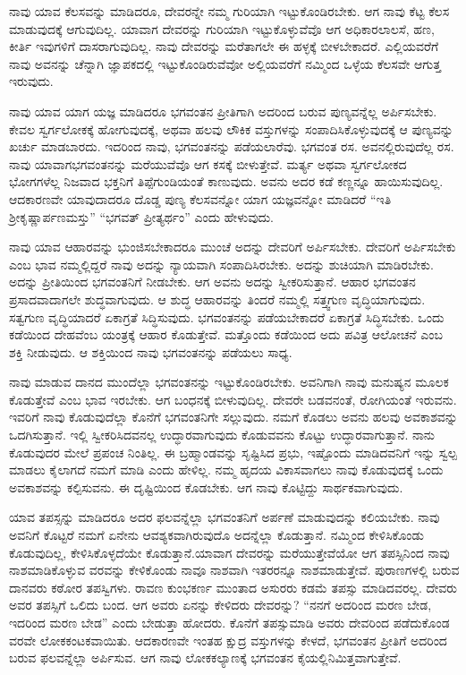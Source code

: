 ನಾವು ಯಾವ ಕೆಲಸವನ್ನು ಮಾಡಿದರೂ, ದೇವರನ್ನೇ ನಮ್ಮ ಗುರಿಯಾಗಿ ಇಟ್ಟುಕೊಂಡಿರಬೇಕು. ಆಗ ನಾವು ಕೆಟ್ಟ ಕೆಲಸ ಮಾಡುವುದಕ್ಕೆ ಆಗುವುದಿಲ್ಲ. ಯಾವಾಗ ದೇವರನ್ನು ಗುರಿಯಾಗಿ ಇಟ್ಟುಕೊಳ್ಳುವೆವೊ ಆಗ ಅಧಿಕಾರಲಾಲಸೆ, ಹಣ, ಕೀರ್ತಿ ಇವುಗಳಿಗೆ ದಾಸರಾಗುವುದಿಲ್ಲ. ನಾವು ದೇವರನ್ನು ಮರೆತಾಗಲೇ ಈ ಹಳ್ಳಕ್ಕೆ ಬೀಳಬೇಕಾದರೆ. ಎಲ್ಲಿಯವರೆಗೆ ನಾವು ಅವನನ್ನು ಚೆನ್ನಾಗಿ ಜ್ಞಾಪಕದಲ್ಲಿ ಇಟ್ಟುಕೊಂಡಿರುವೆವೋ ಅಲ್ಲಿಯವರೆಗೆ ನಮ್ಮಿಂದ ಒಳ್ಳೆಯ ಕೆಲಸವೇ ಆಗುತ್ತ ಇರುವುದು.

ನಾವು ಯಾವ ಯಾಗ ಯಜ್ಞ ಮಾಡಿದರೂ ಭಗವಂತನ ಪ್ರೀತಿಗಾಗಿ ಅದರಿಂದ ಬರುವ ಪುಣ್ಯವನ್ನೆಲ್ಲ ಅರ್ಪಿಸಬೇಕು. ಕೇವಲ ಸ್ವರ್ಗಲೋಕಕ್ಕೆ ಹೋಗುವುದಕ್ಕೆ, ಅಥವಾ ಹಲವು ಲೌಕಿಕ ವಸ್ತುಗಳನ್ನು ಸಂಪಾದಿಸಿಕೊಳ್ಳುವುದಕ್ಕೆ ಆ ಪುಣ್ಯವನ್ನು ಖರ್ಚು ಮಾಡಬಾರದು. ಇದರಿಂದ ನಾವು, ಭಗವಂತನನ್ನು ಪಡೆಯಲಾರೆವು. ಭಗವಂತ ರಸ. ಅವನಲ್ಲಿರುವುದೆಲ್ಲ ರಸ. ನಾವು ಯಾವಾಗ\break ಭಗವಂತನನ್ನು ಮರೆಯುವೆವೊ ಆಗ ಕಸಕ್ಕೆ ಬೀಳುತ್ತೇವೆ. ಮರ್ತ್ಯ ಅಥವಾ ಸ್ವರ್ಗಲೋಕದ ಭೋಗಗಳೆಲ್ಲ ನಿಜವಾದ ಭಕ್ತನಿಗೆ ತಿಪ್ಪೆಗುಂಡಿಯಂತೆ ಕಾಣುವುದು. ಅವನು ಅದರ ಕಡೆ ಕಣ್ಣನ್ನೂ ಹಾಯಿಸುವುದಿಲ್ಲ. ಆದಕಾರಣವೇ ಯಾವುದಾದರೂ ದೊಡ್ಡ ಪುಣ್ಯ ಕೆಲಸವನ್ನೋ ಯಾಗ ಯಜ್ಞವನ್ನೋ ಮಾಡಿದರೆ “ಇತಿ ಶ‍್ರೀಕೃಷ್ಣಾರ್ಪಣಮಸ್ತು” “ಭಗವತ್ ಪ್ರೀತ್ಯರ್ಥಂ” ಎಂದು ಹೇಳುವುದು.

ನಾವು ಯಾವ ಆಹಾರವನ್ನು ಭುಂಜಿಸಬೇಕಾದರೂ ಮುಂಚೆ ಅದನ್ನು ದೇವರಿಗೆ ಅರ್ಪಿಸಬೇಕು. ದೇವರಿಗೆ ಅರ್ಪಿಸಬೇಕು ಎಂಬ ಭಾವ ನಮ್ಮಲ್ಲಿದ್ದರೆ ನಾವು ಅದನ್ನು ನ್ಯಾಯವಾಗಿ ಸಂಪಾದಿಸಿರಬೇಕು. ಅದನ್ನು ಶುಚಿಯಾಗಿ ಮಾಡಿರಬೇಕು. ಅದನ್ನು ಪ್ರೀತಿಯಿಂದ ಭಗವಂತನಿಗೆ ನೀಡಬೇಕು. ಆಗ ಅವನು ಅದನ್ನು ಸ್ವೀಕರಿಸುತ್ತಾನೆ. ಆಹಾರ ಭಗವಂತನ ಪ್ರಸಾದವಾದಾಗಲೇ ಶುದ್ಧವಾಗುವುದು. ಆ ಶುದ್ಧ ಆಹಾರವನ್ನು ತಿಂದರೆ ನಮ್ಮಲ್ಲಿ ಸತ್ತ್ವಗುಣ ವೃದ್ಧಿಯಾಗುವುದು. ಸತ್ವಗುಣ ವೃದ್ಧಿಯಾದರೆ ಏಕಾಗ್ರತೆ ಸಿದ್ಧಿಸುವುದು. ಭಗವಂತನನ್ನು ಪಡೆಯಬೇಕಾದರೆ ಏಕಾಗ್ರತೆ ಸಿದ್ಧಿಸಬೇಕು. ಒಂದು ಕಡೆಯಿಂದ ದೇಹವೆಂಬ ಯಂತ್ರಕ್ಕೆ ಆಹಾರ ಕೊಡುತ್ತೇವೆ. ಮತ್ತೊಂದು ಕಡೆಯಿಂದ ಅದು ಪವಿತ್ರ ಆಲೋಚನೆ ಎಂಬ ಶಕ್ತಿ ನೀಡುವುದು. ಆ ಶಕ್ತಿಯಿಂದ ನಾವು ಭಗವಂತನನ್ನು ಪಡೆಯಲು ಸಾಧ್ಯ.

ನಾವು ಮಾಡುವ ದಾನದ ಮುಂದೆಲ್ಲಾ ಭಗವಂತನನ್ನು ಇಟ್ಟುಕೊಂಡಿರಬೇಕು. ಅವನಿಗಾಗಿ ನಾವು ಮನುಷ್ಯನ ಮೂಲಕ ಕೊಡುತ್ತೇವೆ ಎಂಬ ಭಾವ ಇರಬೇಕು. ಆಗ ಬಂಧನಕ್ಕೆ ಬೀಳುವುದಿಲ್ಲ. ದೇವರೇ ಬಡವನಂತೆ, ರೋಗಿಯಂತೆ ಇರುವನು. ಇವರಿಗೆ ನಾವು ಕೊಡುವುದೆಲ್ಲಾ ಕೊನೆಗೆ ಭಗವಂತನಿಗೇ ಸಲ್ಲುವುದು. ನಮಗೆ ಕೊಡಲು ಅವನು ಹಲವು ಅವಕಾಶವನ್ನು ಒದಗಿಸುತ್ತಾನೆ. ಇಲ್ಲಿ ಸ್ವೀಕರಿಸಿದವನಲ್ಲ ಉದ್ಧಾರವಾಗುವುದು ಕೊಡುವವನು ಕೊಟ್ಟು ಉದ್ಧಾರವಾಗುತ್ತಾನೆ. ನಾನು ಕೊಡುವುದರ ಮೇಲೆ ಪ್ರಪಂಚ ನಿಂತಿಲ್ಲ. ಈ ಬ್ರಹ್ಮಾಂಡವನ್ನು ಸೃಷ್ಟಿಸಿದ ಪ್ರಭು, ಇಷ್ಟೊಂದು ಮಾಡಿದವನಿಗೆ ಇನ್ನು ಸ್ವಲ್ಪ ಮಾಡಲು ಕೈಲಾಗದೆ ನಮಗೆ ಮಾಡಿ ಎಂದು ಹೇಳಿಲ್ಲ. ನಮ್ಮ ಹೃದಯ ವಿಕಾಸವಾಗಲು ನಾವು ಕೊಡುವುದಕ್ಕೆ ಒಂದು ಅವಕಾಶವನ್ನು ಕಲ್ಪಿಸುವನು. ಈ ದೃಷ್ಟಿಯಿಂದ ಕೊಡಬೇಕು. ಆಗ ನಾವು ಕೊಟ್ಟಿದ್ದು ಸಾರ್ಥಕವಾಗುವುದು.

ಯಾವ ತಪಸ್ಸನ್ನು ಮಾಡಿದರೂ ಅದರ ಫಲವನ್ನೆಲ್ಲಾ ಭಗವಂತನಿಗೆ ಅರ್ಪಣೆ ಮಾಡುವುದನ್ನು ಕಲಿಯಬೇಕು. ನಾವು ಅವನಿಗೆ ಕೊಟ್ಟರೆ ನಮಗೆ ಏನೇನು ಆವಶ್ಯಕವಾಗಿರುವುದೊ ಅದನ್ನೆಲ್ಲಾ ಕೊಡುತ್ತಾನೆ. ನಮ್ಮಿಂದ ಕೇಳಿಸಿಕೊಂಡು ಕೊಡುವುದಿಲ್ಲ, ಕೇಳಿಸಿಕೊಳ್ಳದೆಯೇ ಕೊಡುತ್ತಾನೆ.\break ಯಾವಾಗ ದೇವರನ್ನು ಮರೆಯುತ್ತೇವೆಯೋ ಆಗ ತಪಸ್ಸಿನಿಂದ ನಾವು ನಾಶಮಾಡಿಕೊಳ್ಳುವ ವರವನ್ನು ಕೇಳಿಕೊಂಡು ನಾವೂ ನಾಶವಾಗಿ ಇತರರನ್ನೂ ನಾಶಮಾಡುತ್ತೇವೆ. ಪುರಾಣಗಳಲ್ಲಿ ಬರುವ ದಾನವರು ಕಠೋರ ತಪಸ್ವಿಗಳು. ರಾವಣ ಕುಂಭಕರ್ಣ ಮುಂತಾದ ಅಸುರರು ಕಡಮೆ ತಪಸ್ಸು ಮಾಡಿದವರಲ್ಲ. ದೇವರು ಅವರ ತಪಸ್ಸಿಗೆ ಒಲಿದು ಬಂದ. ಆಗ ಅವರು ಏನನ್ನು ಕೇಳಿದರು ದೇವರನ್ನು? “ನನಗೆ ಅದರಿಂದ ಮರಣ ಬೇಡ, ಇದರಿಂದ ಮರಣ ಬೇಡ” ಎಂದು ಬೇಡುತ್ತಾ ಹೋದರು. ಕೊನೆಗೆ ತಪಸ್ಸುಮಾಡಿ ಅವರು ದೇವರಿಂದ ಪಡೆದುಕೊಂಡ ವರವೇ ಲೋಕಕಂಟಕ\-ವಾಯಿತು. ಆದಕಾರಣವೇ ಇಂತಹ ಕ್ಷುದ್ರ ವಸ್ತುಗಳನ್ನು ಕೇಳದೆ, ಭಗವಂತನ ಪ್ರೀತಿಗೆ ಅದರಿಂದ ಬರುವ ಫಲವನ್ನೆಲ್ಲಾ ಅರ್ಪಿಸುವ. ಆಗ ನಾವು ಲೋಕಕಲ್ಯಾಣಕ್ಕೆ ಭಗವಂತನ ಕೈಯಲ್ಲಿ\break ನಿಮಿತ್ತವಾಗುತ್ತೇವೆ.

